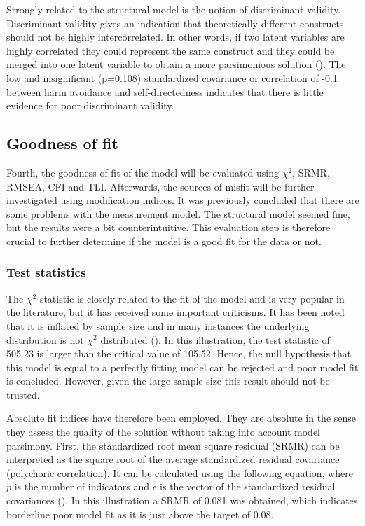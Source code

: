\documentclass[11pt]{article}
\begin{document}
Strongly related to the structural model is the notion of discriminant validity.
Discriminant validity gives an indication that theoretically different
constructs should not be highly intercorrelated. In other words, if two latent
variables are highly correlated they could represent the same construct and they
could be merged into one latent variable to obtain a more parsimonious solution
(\cite{brown2015}). The low and insignificant (p=0.108) standardized covariance
or correlation of -0.1 between harm avoidance and self-directedness indicates
that there is little evidence for poor discriminant validity.

\pagebreak\subsection{Goodness of fit}

Fourth, the goodness of fit of the model will be evaluated using $\chi^2$, SRMR,
RMSEA, CFI and TLI. Afterwards, the sources of misfit will be further
investigated using modification indices. It was previously concluded that there
are some problems with the measurement model. The structural model seemed fine,
but the results were a bit counterintuitive. This evaluation step is therefore
crucial to further determine if the model is a good fit for the data or not.

\subsubsection{Test statistics}

The $\chi^2$ statistic is closely related to the fit of the model and is very
popular in the literature, but it has received some important criticisms.
It has been noted that it is inflated by sample size and in many instances the
underlying distribution is not $\chi^2$ distributed (\cite{brown2015}).
In this illustration, the test statistic of 505.23 is larger than the critical
value of 105.52. Hence, the null hypothesis that this model is equal to a
perfectly fitting model can be rejected and poor model fit is concluded.
However, given the large sample size this result should not be trusted.

Absolute fit indices have therefore been employed. They are absolute in the
sense they assess the quality of the solution without taking into account model
parsimony. First, the standardized root mean square residual (SRMR) can be
interpreted as the square root of the average standardized residual covariance
(polychoric correlation). It can be calculated using the following equation,
where $p$ is the number of indicators and $\epsilon$ is the vector of the
standardized residual covariances (\cite{shi2020}). In this illustration a SRMR
of 0.081 was obtained, which indicates borderline poor model fit as it is just
above the target of 0.08.
\end{document}
